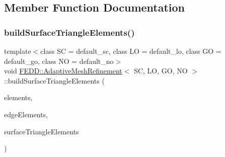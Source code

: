 \subsection{Member Function Documentation}
\mbox{\label{classFEDD_1_1AdaptiveMeshRefinement_ac17385ec3b84fd7c285b5442476f40a9}} 
\subsubsection{\texorpdfstring{build\+Surface\+Triangle\+Elements()}{buildSurfaceTriangleElements()}}
{\footnotesize\ttfamily template$<$class SC = default\+\_\+sc, class LO = default\+\_\+lo, class GO = default\+\_\+go, class NO = default\+\_\+no$>$ \\
void \hyperlink{classFEDD_1_1AdaptiveMeshRefinement}{F\+E\+D\+D\+::\+Adaptive\+Mesh\+Refinement}$<$ SC, LO, GO, NO $>$\+::build\+Surface\+Triangle\+Elements (\begin{DoxyParamCaption}\item[{\hyperlink{classFEDD_1_1AdaptiveMeshRefinement_a9a08c5e3801ff9f9f3dff7997f9f4b1b}{Elements\+Ptr\+\_\+\+Type}}]{elements,  }\item[{\hyperlink{classFEDD_1_1AdaptiveMeshRefinement_a495f60e86da92289b7fe1c15e291660d}{Edge\+Elements\+Ptr\+\_\+\+Type}}]{edge\+Elements,  }\item[{\hyperlink{classFEDD_1_1AdaptiveMeshRefinement_aabda3ef3658f8847265104c6cf9a3877}{Surface\+Elements\+Ptr\+\_\+\+Type}}]{surface\+Triangle\+Elements }\end{DoxyParamCaption})}

\mbox{\label{classFEDD_1_1AdaptiveMeshRefinement_a43e57f7bf39f588491888ebdde7b4010}} 

